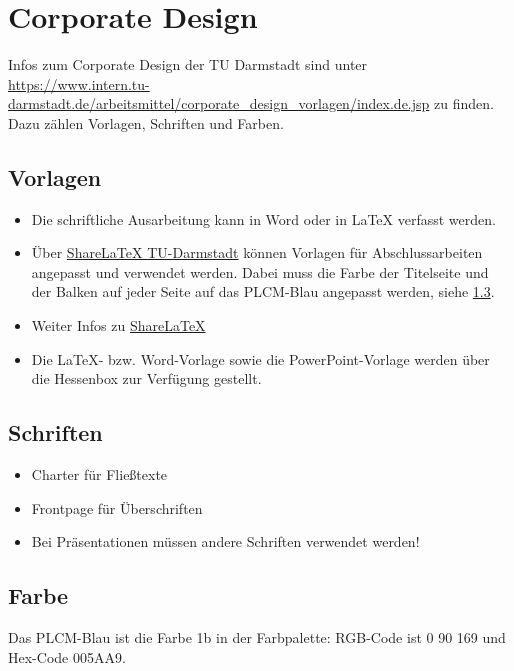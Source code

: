 \section{Corporate Design}

\begin{sloppypar}
Infos zum Corporate Design der TU Darmstadt sind unter \url{https://www.intern.tu-darmstadt.de/arbeitsmittel/corporate_design_vorlagen/index.de.jsp} zu finden.\\
Dazu zählen Vorlagen, Schriften und Farben. 
\end{sloppypar}

\subsection{Vorlagen}

\begin{itemize}
    \item Die schriftliche Ausarbeitung kann in Word oder in LaTeX verfasst werden. 

    \item Über \href{https://sharelatex.tu-darmstadt.de/}{ShareLaTeX TU-Darmstadt}  können Vorlagen für Abschlussarbeiten angepasst und verwendet werden. Dabei muss die Farbe der Titelseite und der Balken auf jeder Seite auf das PLCM-Blau angepasst werden, siehe \ref{subsec:farbe}. 

    \item Weiter Infos zu \href{https://www.hrz.tu-darmstadt.de/services/it_services/sharelatex_hrz/index.de.jsp}{ShareLaTeX}

    \item Die LaTeX- bzw. Word-Vorlage sowie die PowerPoint-Vorlage werden über die Hessenbox zur Verfügung gestellt. 
\end{itemize}

\subsection{Schriften}
\begin{itemize}
    \item Charter für Fließtexte
    \item Frontpage für Überschriften
    \item Bei Präsentationen müssen andere Schriften verwendet werden!
\end{itemize}

\subsection{Farbe}
\label{subsec:farbe}
Das PLCM-Blau ist die Farbe 1b in der Farbpalette: RGB-Code ist 0 90 169 und Hex-Code 005AA9.

